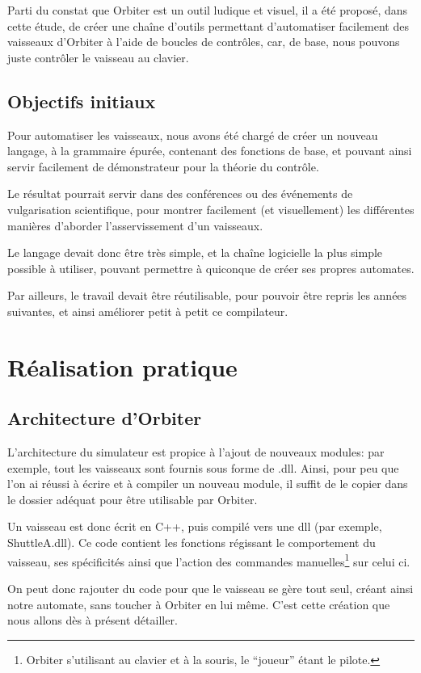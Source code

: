 \documentclass[a4paper,11pt]{article}
\begin{document}
        Parti du constat que Orbiter est un outil ludique et visuel, il a été proposé, dans cette étude, de créer une chaîne d'outils permettant d'automatiser facilement des vaisseaux d'Orbiter à l'aide de boucles de contrôles, car, de base, nous pouvons juste contrôler le vaisseau au clavier.

    \subsection{Objectifs initiaux}
        Pour automatiser les vaisseaux, nous avons été chargé de créer un nouveau langage, à la grammaire épurée, contenant des fonctions de base, et pouvant ainsi servir facilement de démonstrateur pour la théorie du contrôle.

        Le résultat pourrait servir dans des conférences ou des événements de vulgarisation scientifique, pour montrer facilement (et visuellement) les différentes manières d'aborder l'asservissement d'un vaisseaux.

        Le langage devait donc être très simple, et la chaîne logicielle la plus simple possible à utiliser, pouvant permettre à quiconque de créer ses propres automates.

        Par ailleurs, le travail devait être réutilisable, pour pouvoir être repris les années suivantes, et ainsi améliorer petit à petit ce compilateur.

\section{Réalisation pratique}
    \subsection{Architecture d'Orbiter}
        L'architecture du simulateur est propice à l'ajout de nouveaux modules: par exemple, tout les vaisseaux sont fournis sous forme de .dll. Ainsi, pour peu que l'on ai réussi à écrire et à compiler un nouveau module, il suffit de le copier dans le dossier adéquat pour être utilisable par Orbiter.
        
        Un vaisseau est donc écrit en C++, puis compilé vers une dll (par exemple, ShuttleA.dll). Ce code contient les fonctions régissant le comportement du vaisseau, ses spécificités ainsi que l'action des commandes manuelles\footnote{Orbiter s'utilisant au clavier et à la souris, le "`joueur"' étant le pilote.} sur celui ci.
        
        On peut donc rajouter du code pour que le vaisseau se gère tout seul, créant ainsi notre automate, sans toucher à Orbiter en lui même. C'est cette création que nous allons dès à présent détailler.
\end{document}
